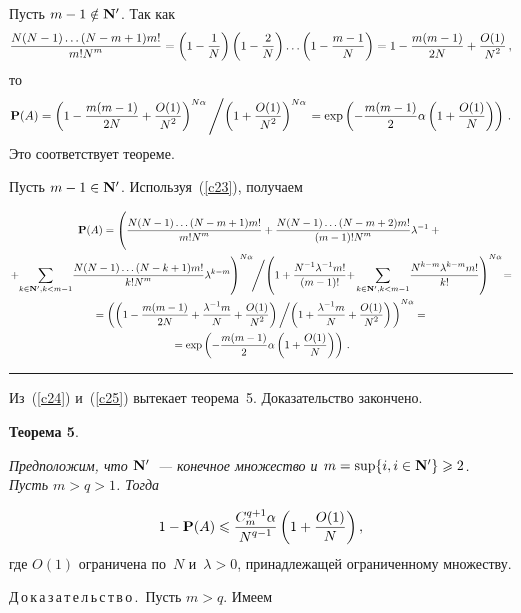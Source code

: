 Пусть $m-1\notin {\bf N'}$. Так как
\begin{equation} %
\fr{N(N-1)\dots (N-m+1)m!}{m!N^m} =
\left(1-\fr{1}{N}\right)\left(1-\fr{2}{N}\right)\dots\left(1-\fr{m-1}{N}\right)=
 1-\fr{m(m-1)}{2N} +\fr{O(1)}{N^2}\,,
\label{c23}
\end{equation} %
то
\begin{equation} %
{\bf P}(A)={\left(1- \fr{m(m-1)}{2N} +\fr{O(1)}{N^2}\right)^{N\alpha}}\left/{\left( 1
+\fr{O(1)}{N^2}\right)^{N\alpha}}\right.=
\exp\left(-\fr{m(m-1)}{2}\alpha\left(1+\fr{O(1)}{N}\right)\right)\,.
\label{c24}
\end{equation} %
Это соответствует теореме.

Пусть $m-1\in {\bf N'}$. Используя~(\ref{c23}), получаем


\noindent
\begin{multline}
{\bf P}(A)
=\left(\fr{N(N-1)\dots (N-m+1)m!}{m!N^m} +
\fr{N(N-1)\dots (N-m+2)m!}{(m-1)!N^m}\lambda^{-1}+{}
\vphantom{\sum\limits_{k\in{\bf N'},k<m}
\fr{N^{k-m}\lambda^{k-m}m!}{k!}}
\right.\\
\left.
+\!\sum_{k\in{\bf N'},k<m-1}\!\fr{N(N-1)\dots
(N-k+1)m!}{k!N^m}\lambda^{k-m}\right)^{N\alpha}\!\!\left/\left(\vphantom{\sum\limits_{k\in{\bf N'},k<m}
\fr{N^{k-m}\lambda^{k-m}m!}{k!}}
1+\fr{N^{-1}\lambda^{-1}m!}{(m-1)!}+\right.\!\sum\limits_{k\in{\bf N'},k<m-1}\!
\fr{N^{k-m}\lambda^{k-m}m!}{k!}\right)^{N\alpha}\!=\\
{}=
\left(\left(1-\fr{m(m-1)}{2N}+\fr{\lambda^{-1}m}{N}+\fr{O(1)}{N^2}\right)\left/ \left( 
1+\fr{\lambda^{-1}m}{N}+\fr{O(1)}{N^2}\right)\right. \right)^{N\alpha}={}\\
{}=
\exp\left(-\fr{m(m-1)}{2}\alpha\left(1+\fr{O(1)}{N}\right)\right)\,.
\label{c25}
\end{multline}

\hrule

\begin{multicols}{2}


Из~(\ref{c24}) и~(\ref{c25}) вытекает теорема~5. Доказательство закончено.

\smallskip

\noindent
{\bf Теорема 5}.  {\it Предположим, что ${\bf N'}$~--- конечное
множество и $m=\sup\{i, i\in{\bf N'}\}\ge 2$.  Пусть $m>q>1$. Тогда

\noindent
\begin{equation*}
1-{\bf P}(A)\le
\fr{C_m^{q+1}\alpha}{N^{q-1}}\left(1+\fr{O(1)}{N}\right),
\end{equation*}
где $O(1)$ ограничена по~$N$ и~$\lambda>0$, принадлежащей ограниченному множеству.}

\bigskip

\noindent
Д\,о\,к\,а\,з\,а\,т\,е\,л\,ь\,с\,т\,в\,о\,.\ Пусть $m>q$. Имеем

\end{multicols}

